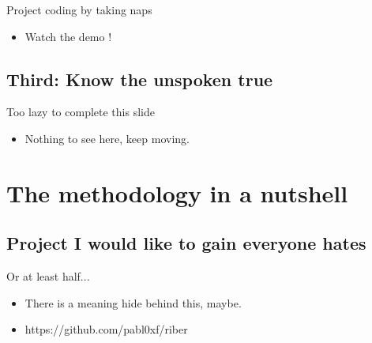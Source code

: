 \begin{frame}{Project coding by taking naps}{ }

\begin{itemize}
  \item
    Watch the demo !
   \end{itemize}
 
\end{frame}

\subsection{Third: Know the unspoken true}

\begin{frame}{Too lazy to complete this slide}{}

\begin{itemize}
  \item
    Nothing to see here, keep moving.
  \end{itemize}
\end{frame}


\section{The methodology in a nutshell}

\subsection{Project I would like to gain everyone hates}

\begin{frame}{Or at least half...}
\begin{itemize}
 \item
   There is a meaning hide behind this, maybe.  
 \item
   https://github.com/pabl0xf/riber
  \end{itemize}
 \end{frame}

